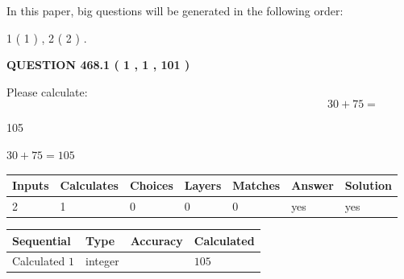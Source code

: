 \documentclass[12pt]{article}
\begin{document}
In this paper, big questions will be generated in the following order: 
   
   
   1 ( 1 )
 ,
   2 ( 2 )
 .
  
\vspace{0.2in}
  
{\textbf{\Large{QUESTION
468.1 
 ( 1 , 1 , 101 )
}}}
  
  
 
Please calculate:
\begin{equation}
30 +  %
75 = \nonumber
\end{equation}
 
 
 
\noindent{}
 
 

105
 
 
\noindent{}
 
 

 
 
 
\noindent{}
 
 

$ %
30 +  %
75=   %
105$
 
 
\noindent{}
 
 

 
   
   
   
   
\noindent\begin{tabular}{|l|l|l|l|l|l|l|}
 \hline
Inputs & Calculates & Choices & Layers & Matches & Answer & Solution \\ \hline
 2  & 
 1  & 
 0
  & 
 0  & 
 0  & 
  yes & 
  yes 
  \\ \hline
 \end{tabular}
   
   
   
   
\noindent{}
   
   
  
  
\noindent\begin{tabular}{|l|l|l|l|}
\hline
 Sequential & Type & Accuracy & Calculated \\ 
\hline
 
 
  Calculated $  1 $ & integer &  & 
  $ 105 $ 
 \\  \hline  
 \end{tabular}
   
\end{document}
